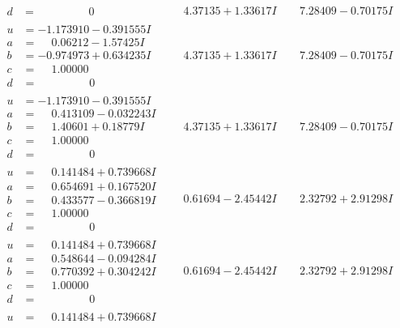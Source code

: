 \documentclass[1p]{elsarticle_modified}
\theoremstyle{definition}
\begin{document}
$$\begin{array}{c|c|c}
\begin{aligned}
d &= \phantom{-0.000000 } 0\end{aligned}
 & \phantom{-}4.37135 + 1.33617 I & \phantom{-}7.28409 - 0.70175 I \\ \hline\begin{aligned}
u &= -1.173910 - 0.391555 I \\
a &= \phantom{-}0.06212 - 1.57425 I \\
b &= -0.974973 + 0.634235 I \\
c &= \phantom{-}1.00000\phantom{ +0.000000I} \\
d &= \phantom{-0.000000 } 0\end{aligned}
 & \phantom{-}4.37135 + 1.33617 I & \phantom{-}7.28409 - 0.70175 I \\ \hline\begin{aligned}
u &= -1.173910 - 0.391555 I \\
a &= \phantom{-}0.413109 - 0.032243 I \\
b &= \phantom{-}1.40601 + 0.18779 I \\
c &= \phantom{-}1.00000\phantom{ +0.000000I} \\
d &= \phantom{-0.000000 } 0\end{aligned}
 & \phantom{-}4.37135 + 1.33617 I & \phantom{-}7.28409 - 0.70175 I \\ \hline\begin{aligned}
u &= \phantom{-}0.141484 + 0.739668 I \\
a &= \phantom{-}0.654691 + 0.167520 I \\
b &= \phantom{-}0.433577 - 0.366819 I \\
c &= \phantom{-}1.00000\phantom{ +0.000000I} \\
d &= \phantom{-0.000000 } 0\end{aligned}
 & \phantom{-}0.61694 - 2.45442 I & \phantom{-}2.32792 + 2.91298 I \\ \hline\begin{aligned}
u &= \phantom{-}0.141484 + 0.739668 I \\
a &= \phantom{-}0.548644 - 0.094284 I \\
b &= \phantom{-}0.770392 + 0.304242 I \\
c &= \phantom{-}1.00000\phantom{ +0.000000I} \\
d &= \phantom{-0.000000 } 0\end{aligned}
 & \phantom{-}0.61694 - 2.45442 I & \phantom{-}2.32792 + 2.91298 I \\ \hline\begin{aligned}
u &= \phantom{-}0.141484 + 0.739668 I \\

\end{aligned}
\end{array}$$
\end{document}
